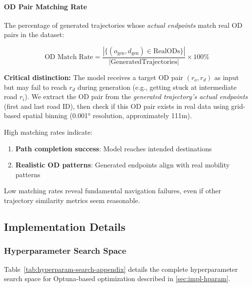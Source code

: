 \paragraph{OD Pair Matching Rate}

The percentage of generated trajectories whose \emph{actual endpoints} match real OD pairs in the dataset:

\begin{equation}
\text{OD Match Rate} = \frac{|\{(o_{\text{gen}}, d_{\text{gen}}) \in \text{RealODs}\}|}{|\text{GeneratedTrajectories}|} \times 100\%
\label{eq:od-match-appendix}
\end{equation}

\textbf{Critical distinction:} The model receives a target OD pair $(r_o, r_d)$ as input but may fail to reach $r_d$ during generation (e.g., getting stuck at intermediate road $r_i$). We extract the OD pair from the \emph{generated trajectory's actual endpoints} (first and last road ID), then check if this OD pair exists in real data using grid-based spatial binning (0.001° resolution, approximately 111m).

High matching rates indicate:
\begin{enumerate}[noitemsep,topsep=0pt]
\item \textbf{Path completion success}: Model reaches intended destinations
\item \textbf{Realistic OD patterns}: Generated endpoints align with real mobility patterns
\end{enumerate}

Low matching rates reveal fundamental navigation failures, even if other trajectory similarity metrics seem reasonable.

\subsection{Implementation Details}
\label{app:implementation}

\subsubsection{Hyperparameter Search Space}
\label{app:hyperparam-space}

Table~\ref{tab:hyperparam-search-appendix} details the complete hyperparameter search space for Optuna-based optimization described in \autoref{sec:impl-hparam}.

